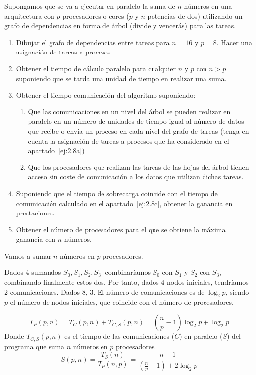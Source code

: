 \begin{ejercicio}
    Supongamos que se va a ejecutar en paralelo la suma de $n$ números en una arquitectura con $p$
    procesadores o cores ($p$ y $n$ potencias de dos) utilizando un grafo de dependencias en forma de árbol (divide
    y vencerás) para las tareas.
    \begin{enumerate}
        \item\label{ej:2.8a} Dibujar el grafo de dependencias entre tareas para $n=16$ y $p=8$. Hacer una asignación de tareas
        a procesos.
        \item Obtener el tiempo de cálculo paralelo para cualquier $n$ y $p$ con $n>p$ suponiendo que se tarda una
        unidad de tiempo en realizar una suma.
        \item\label{ej:2.8c} Obtener el tiempo comunicación del algoritmo suponiendo:
        \begin{enumerate}
            \item Que las comunicaciones en un nivel del árbol se pueden realizar en paralelo en un número de unidades de tiempo igual al número de
            datos que recibe o envía un proceso en cada nivel del grafo de tareas (tenga en cuenta la asignación
            de tareas a procesos que ha considerado en el apartado~\ref{ej:2.8a})
            \item Que los procesadores que realizan las tareas de las hojas del árbol tienen acceso sin coste de comunicación a los datos que utilizan
            dichas tareas.
        \end{enumerate}

        \item Suponiendo que el tiempo de sobrecarga coincide con el tiempo de comunicación calculado en el apartado~\ref{ej:2.8c}, obtener la ganancia en prestaciones.
        \item Obtener el número de procesadores para el que se obtiene la máxima ganancia con $n$ números.
    \end{enumerate}

Vamos a sumar $n$ números en $p$ procesadores. 

Dados 4 sumandos $S_0, S_1, S_2, S_3$, combinaríamos $S_0$ con $S_1$ y $S_2$ con $S_3$, combinando finalmente estos dos. Por tanto, dados 4 nodos iniciales, tendríamos 2 comunicaciones. Dados 8, 3. El número de comunicaciones es de $\log_2 p$, siendo $p$ el número de nodos iniciales, que coincide con el número de procesadores.

\begin{equation*}
    T_P(p,n) = T_C(p,n) + T_{C,S}(p,n) = \left(\frac{n}{p}-1\right)\log_2 p + \log_2 p
\end{equation*}
Donde $T_{C,S}(p,n)$ es el tiempo de las comunicaciones ($C$) en paralelo ($S$) del programa que suma $n$ números en $p$ procesadores.
\begin{equation*}
    S(p,n) = \dfrac{T_S(n)}{T_P(n,p)} = \dfrac{n-1}{\left(\frac{n}{p}-1\right)+2\log_2p} 
\end{equation*}

\end{ejercicio}

